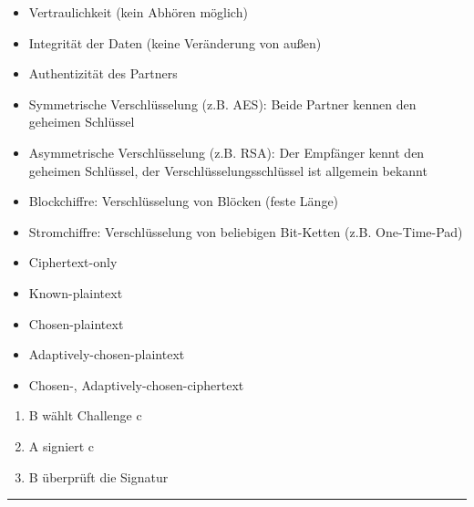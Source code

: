 \begin{multicols}{2}
\begin{itemize}
	\item Vertraulichkeit (kein Abhören möglich)
	\item Integrität der Daten (keine Veränderung von außen)
	\item Authentizität des Partners
\end{itemize}

\begin{itemize}
	\item Symmetrische Verschlüsselung (z.B. AES): Beide Partner kennen den geheimen Schlüssel
	\item Asymmetrische Verschlüsselung (z.B. RSA): Der Empfänger kennt den geheimen Schlüssel, der Verschlüsselungsschlüssel ist allgemein bekannt
\end{itemize}

\begin{itemize}
	\item Blockchiffre: Verschlüsselung von Blöcken (feste Länge) 
	\item Stromchiffre: Verschlüsselung von beliebigen Bit-Ketten (z.B. One-Time-Pad)
\end{itemize}

\begin{itemize}
	\item Ciphertext-only
	\item Known-plaintext
	\item Chosen-plaintext
	\item Adaptively-chosen-plaintext
	\item Chosen-, Adaptively-chosen-ciphertext
\end{itemize}

\begin{enumerate}
	\item B wählt Challenge c  
	\item A signiert c 
	\item B überprüft die Signatur
\end{enumerate}
\end{multicols}\rule{\textwidth}{1pt}